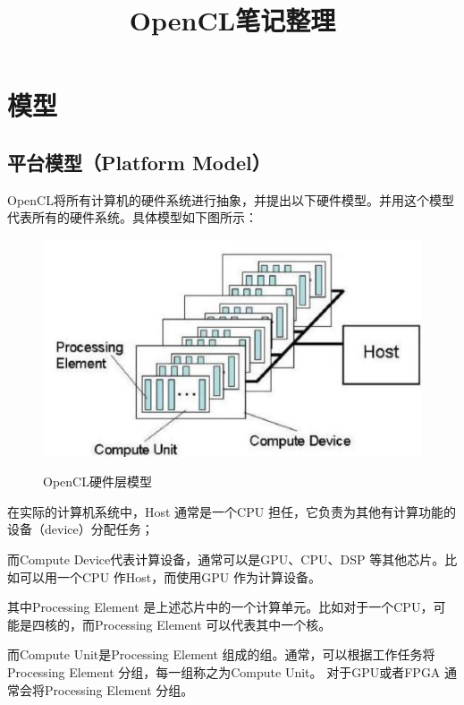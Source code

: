 \documentclass{ctexart}
\begin{document}
\title{OpenCL笔记整理}
\author{ }
\maketitle

\newpage
\section{模型}

\subsection{平台模型（Platform Model）}
OpenCL将所有计算机的硬件系统进行抽象，并提出以下硬件模型。并用这个模型代表所有的硬件系统。具体模型如下图所示：

\begin{figure}[!ht]
  \centering
  \includegraphics[width=0.7\linewidth]{yingjianceng.jpg}\\
  \caption{OpenCL硬件层模型}
\end{figure}
在实际的计算机系统中，Host 通常是一个CPU 担任，它负责为其他有计算功能的设备（device）分配任务；

而Compute Device代表计算设备，通常可以是GPU、CPU、DSP 等其他芯片。比如可以用一个CPU 作Host，而使用GPU 作为计算设备。

其中Processing Element 是上述芯片中的一个计算单元。比如对于一个CPU，可能是四核的，而Processing Element 可以代表其中一个核。

而Compute Unit是Processing Element 组成的组。通常，可以根据工作任务将Processing Element 分组，每一组称之为Compute Unit。 对于GPU或者FPGA 通常会将Processing Element 分组。
\end{document}
